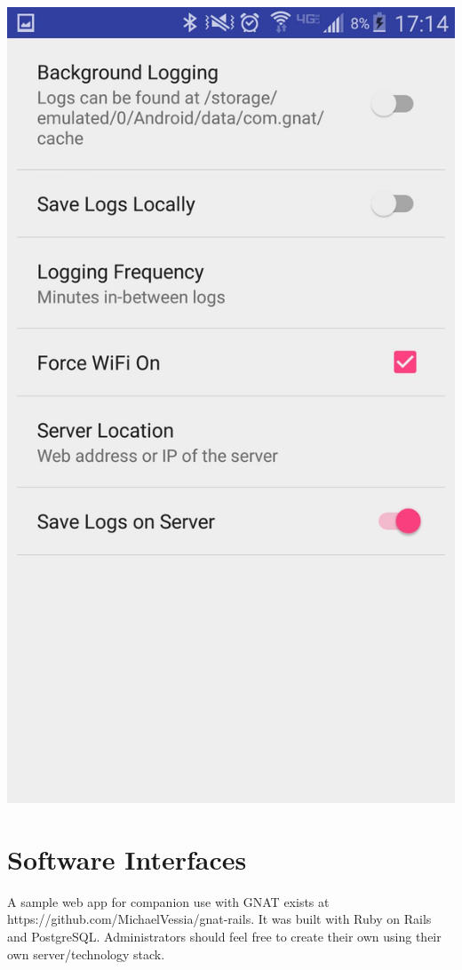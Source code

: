 \documentclass{scrreprt}
\def\railssource{https://github.com/MichaelVessia/gnat-rails}
\begin{document}
\begin{center}
  \includegraphics[scale=0.3]{settings.jpg}
  \end{center}

\section{Software Interfaces}

A sample web app for companion use with GNAT exists at \railssource.  It was built with Ruby on Rails and PostgreSQL.  Administrators should feel free to create their own using their own server/technology stack.
\end{document}
